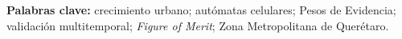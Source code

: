 %
%
%

\enlargethispage{\baselineskip}
\vspace{0.3cm}
\noindent\textbf{Palabras clave:} crecimiento urbano; autómatas celulares;
Pesos de Evidencia; validación multitemporal; \textit{Figure of Merit};
Zona Metropolitana de Querétaro.
\cleardoublepage

